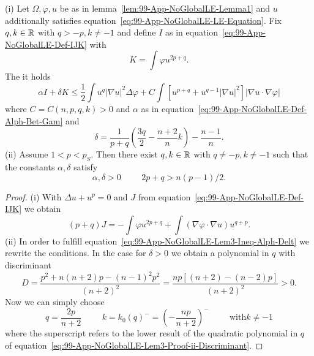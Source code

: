 \begin{lemma}
	\label{lem:99-App-NoGlobalLE-Lemm8-10}
	(i) Let $\Omega,\varphi,u$ be as in lemma~\ref{lem:99-App-NoGlobalLE-Lemma1} and $u$ additionally satisfies equation~\eqref{eq:99-App-NoGlobalLE-LE-Equation}.
	Fix $q,k\in\mathbb{R}$ with $q>-p,k\neq-1$ and define $I$ as in equation~\eqref{eq:99-App-NoGlobalLE-Def-IJK} with
	\begin{equation}
		K = \int\varphi u^{2p+q}.
		\label{eq:99-App-NoGlobalLE-K-NewDef}
	\end{equation}
	The it holds
	\begin{equation}
		\alpha I + \delta K \leq \frac{1}{2}\int u^q |\nabla u|^2\Delta \varphi + C\int\left[u^{p+q} +u^{q-1}|\nabla u|^2\right]|\nabla u\cdot \nabla\varphi|
		\label{eq:99-App-NoGlobalLE-lemma2-statement}
	\end{equation}
	where $C=C(n,p,q,k)>0$ and $\alpha$ as in equation~\eqref{eq:99-App-NoGlobalLE-Def-Alph-Bet-Gam} and
	\begin{equation}
		\delta=\frac{1}{p+q}\left(\frac{3q}{2}-\frac{n+2}{n}k\right)-\frac{n-1}{n}.
		\label{eq:99-App-NoGlobalLE-Def-Delt}
	\end{equation}
	(ii) Assume $1<p<p_S$.
	Then there exist $q,k\in\mathbb{R}$ with $q\neq -p,k\neq-1$ such that the constants $\alpha,\delta$ satisfy
	\begin{equation}
		\alpha,\delta>0\hspace{1cm}2p+q>n(p-1)/2.
		\label{eq:99-App-NoGlobalLE-Lem3-Ineq-Alph-Delt}
	\end{equation}
\end{lemma}
\begin{proof}
	(i) With $\Delta u+u^p=0$ and $J$ from equation~\eqref{eq:99-App-NoGlobalLE-Def-IJK} we obtain
	\begin{equation}
		(p+q)J = -\int\varphi u^{2p+q}+\int(\nabla\varphi\cdot\nabla u)u^{q+p}.
		\label{eq:99-App-NoGlobalLE-Lem3-Proof-i}
	\end{equation}
	(ii) In order to fulfill equation~\eqref{eq:99-App-NoGlobalLE-Lem3-Ineq-Alph-Delt} we rewrite the conditions.
	In the case for $\delta>0$ we obtain a polynomial in $q$ with discriminant
	\begin{equation}
		D=\frac{p^{2}+n(n+2) p-(n-1)^{2} p^{2}}{(n+2)^{2}}=\frac{n p[(n+2)-(n-2) p]}{(n+2)^{2}}>0.
		\label{eq:99-App-NoGlobalLE-Lem3-Proof-ii-Discriminant}
	\end{equation}
	Now we can simply choose
	\begin{equation}
		q=\frac{2p}{n+2}\hspace{1cm} k=k_0(q)^{-}=\left(-\frac{np}{n+2}\right)^- \hspace{1cm}\text{with} k\neq-1
		\label{eq:99-App-NoGlobalLE-Lem3-Proof-ii}
	\end{equation}
	where the superscript refers to the lower result of the quadratic polynomial in $q$ of equation~\eqref{eq:99-App-NoGlobalLE-Lem3-Proof-ii-Discriminant}.
\end{proof}
